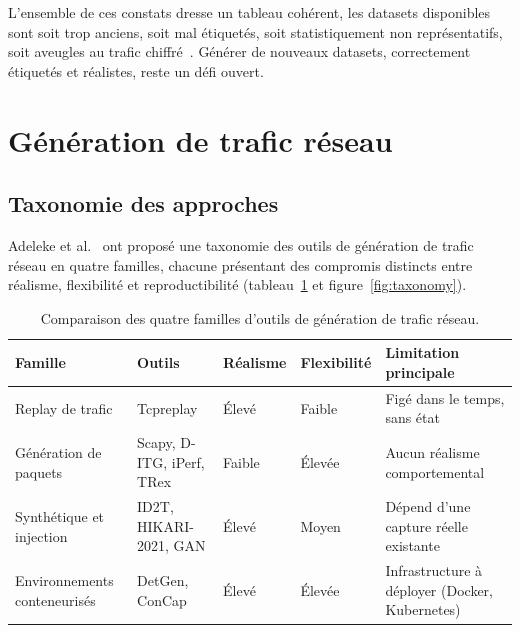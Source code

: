 \documentclass[12pt, a4paper]{report}
\begin{document}
L'ensemble de ces constats dresse un tableau cohérent, les datasets disponibles sont soit trop
anciens, soit mal étiquetés, soit statistiquement non représentatifs, soit aveugles au trafic
chiffré~\cite{hikari2021}. Générer de nouveaux datasets, correctement étiquetés et réalistes,
reste un défi ouvert.
 
\section{Génération de trafic réseau}
 
\subsection{Taxonomie des approches}
 
Adeleke et al.~\cite{adeleke2022} ont proposé une taxonomie des outils de génération de trafic
réseau en quatre familles, chacune présentant des compromis distincts entre réalisme,
flexibilité et reproductibilité (tableau~\ref{tab:taxonomy} et figure~\ref{fig:taxonomy}).
 
\begin{table}[H]
\centering
\caption{Comparaison des quatre familles d'outils de génération de trafic réseau.}
\label{tab:taxonomy}
\small
\begin{tabular}{p{3cm} p{3.7cm} p{1.5cm} p{1.6cm} p{3.5cm}}
\toprule
\textbf{Famille} & \textbf{Outils} & \textbf{Réalisme} & \textbf{Flexibilité} & \textbf{Limitation principale} \\
\midrule
Replay de trafic & Tcpreplay & Élevé & Faible & Figé dans le temps, sans état \\
Génération de paquets & Scapy, D-ITG, iPerf, TRex & Faible & Élevée & Aucun réalisme comportemental \\
Synthétique et injection & ID2T, HIKARI-2021, GAN & Élevé & Moyen & Dépend d'une capture réelle existante \\
Environnements conteneurisés & DetGen, ConCap & Élevé & Élevée & Infrastructure à déployer (Docker, Kubernetes) \\
\bottomrule
\end{tabular}
\end{table}
 
\end{document}
